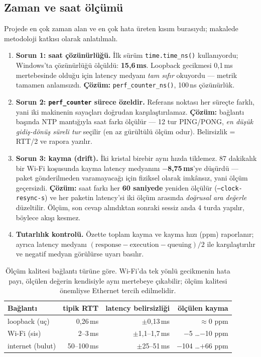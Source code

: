 \documentclass[11pt,a4paper]{article}
\newcommand{\ms}{\,ms}
\newcommand{\kod}[1]{\texttt{\small #1}}
\begin{document}
\subsection{Zaman ve saat ölçümü}

Projede en çok zaman alan ve en çok hata üreten kısım burasıydı; makalede
metodoloji katkısı olarak anlatılmalı.

\begin{enumerate}[leftmargin=1.5em,itemsep=0.3em]

\item \textbf{Sorun 1: saat çözünürlüğü.} İlk sürüm \kod{time.time\_ns()}
kullanıyordu; Windows'ta çözünürlüğü ölçüldü: \textbf{15{,}6\ms}. Loopback
gecikmesi 0{,}1\ms{} mertebesinde olduğu için latency medyanı \emph{tam sıfır}
okuyordu --- metrik tamamen anlamsızdı.
\textbf{Çözüm:} \kod{perf\_counter\_ns()}, 100\,ns çözünürlük.

\item \textbf{Sorun 2: \kod{perf\_counter} sürece özeldir.} Referans noktası
her süreçte farklı, yani iki makinenin sayaçları doğrudan karşılaştırılamaz.
\textbf{Çözüm:} bağlantı başında NTP mantığıyla saat farkı ölçülür ---
12 tur PING/PONG, \emph{en düşük gidiş-dönüş süreli tur} seçilir (en az
gürültülü ölçüm odur). Belirsizlik = RTT/2 ve rapora yazılır.

\item \textbf{Sorun 3: kayma (drift).} İki kristal birebir aynı hızda
tiklemez. 87 dakikalık bir Wi-Fi koşusunda kayma latency medyanını
\textbf{$-$8{,}75\ms}'ye düşürdü --- paket gönderilmeden varamayacağı için
fiziksel olarak imkânsız, yani ölçüm geçersizdi.
\textbf{Çözüm:} saat farkı her \textbf{60 saniyede} yeniden ölçülür
(\kod{--clock-resync-s}) ve her paketin latency'si iki ölçüm arasında
\emph{doğrusal ara değerle} düzeltilir. Ölçüm, son cevap alındıktan sonraki
sessiz anda 4 turda yapılır, böylece akışı kesmez.

\item \textbf{Tutarlılık kontrolü.} Özette toplam kayma ve kayma hızı (ppm)
raporlanır; ayrıca latency medyanı
$(\text{response}-\text{execution}-\text{queuing})/2$ ile karşılaştırılır ve
negatif medyan görülürse uyarı basılır.
\end{enumerate}

\begin{table}[H]
\centering\small
\begin{tabular}{@{}lrrr@{}}
\toprule
\textbf{Bağlantı} & \textbf{tipik RTT} & \textbf{latency belirsizliği} & \textbf{ölçülen kayma} \\
\midrule
loopback (uç)    & 0{,}26\ms & $\pm$0{,}13\ms & $\approx$0 ppm \\
Wi-Fi (sis)      & 2--3\ms   & $\pm$1{,}1--1{,}7\ms & $-$5 \ldots $-$10 ppm \\
internet (bulut) & 50--100\ms & $\pm$25--51\ms & $-$104 \ldots $+$66 ppm \\
\bottomrule
\end{tabular}
\caption{Ölçüm kalitesi bağlantı türüne göre. Wi-Fi'da tek yönlü gecikmenin
hata payı, ölçülen değerin kendisiyle aynı mertebeye çıkabilir; ölçüm kalitesi
önemliyse Ethernet tercih edilmelidir.}
\end{table}
\end{document}
